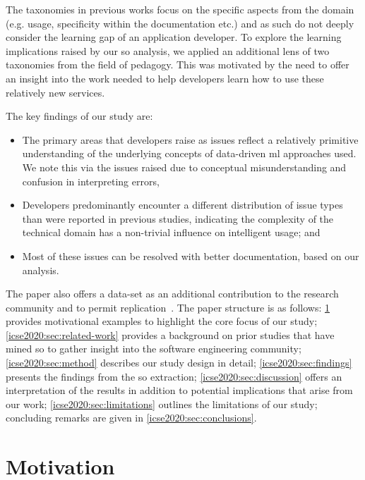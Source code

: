 The taxonomies in previous works focus on the specific aspects from the domain (e.g.  usage, specificity within the documentation etc.) and as such do not deeply consider the learning gap of an application developer.
To explore the  learning implications raised by our \gls{so} analysis, we applied an additional lens of two taxonomies from the field of pedagogy. This was motivated by the need to offer an insight into the work needed to help developers learn how to use these relatively new services.

The key findings of our study are:
\begin{itemize}
\item The primary areas that developers raise as issues reflect a relatively primitive understanding of the underlying concepts of data-driven \gls{ml} approaches used. We note this via the issues raised due to conceptual misunderstanding and confusion in interpreting errors,
\item Developers predominantly encounter a different distribution of issue types than were reported in previous studies, indicating the complexity of the technical domain has a non-trivial influence on intelligent  usage; and
\item Most of these issues can be resolved with better documentation, based on our analysis.
\end{itemize}

The paper also offers a data-set as an additional contribution to the research community and to permit replication~. The paper structure is as follows: \cref{icse2020:sec:motivation} provides motivational examples to highlight the core focus of our study; \cref{icse2020:sec:related-work} provides a background on prior studies that have mined \gls{so} to gather insight into the software engineering community; \cref{icse2020:sec:method} describes our study design in detail; \cref{icse2020:sec:findings} presents the findings from the \gls{so} extraction; \cref{icse2020:sec:discussion} offers an interpretation of the results in addition to potential implications that arise from our work; \cref{icse2020:sec:limitations} outlines the limitations of our study; concluding remarks are given in \cref{icse2020:sec:conclusions}.

\section{Motivation}
\label{icse2020:sec:motivation}

